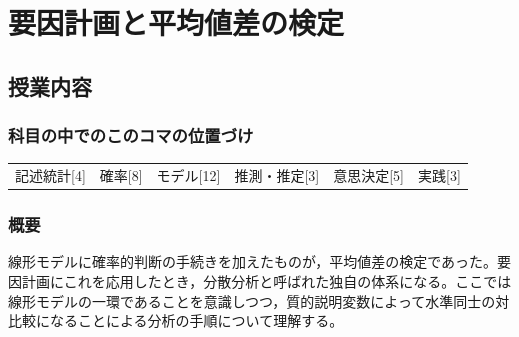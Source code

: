 \section{要因計画と平均値差の検定}
\label{D1_lesson21}

\subsection{授業内容}
\subsubsection{科目の中でのこのコマの位置づけ}
\begin{tabular}[t]{cccccc}
    記述統計[4] & 確率[8] & モデル[12] & 推測・推定[3] & 意思決定[5] & 実践[3]
\end{tabular}

\subsubsection{概要}
線形モデルに確率的判断の手続きを加えたものが，平均値差の検定であった。要因計画にこれを応用したとき，分散分析と呼ばれた独自の体系になる。ここでは線形モデルの一環であることを意識しつつ，質的説明変数によって水準同士の対比較になることによる分析の手順について理解する。
